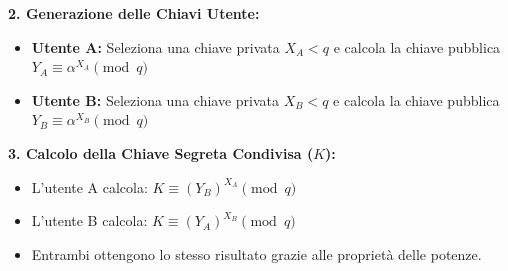 \documentclass{article}
\begin{document}
\vspace{0.3cm}
\noindent \textbf{2. Generazione delle Chiavi Utente:}
\begin{itemize}
    \item \textbf{Utente A:} Seleziona una chiave privata $X_A < q$ e calcola la chiave pubblica $Y_A \equiv \alpha^{X_A} \pmod q$
    \item \textbf{Utente B:} Seleziona una chiave privata $X_B < q$ e calcola la chiave pubblica $Y_B \equiv \alpha^{X_B} \pmod q$
\end{itemize}

\vspace{0.3cm}
\noindent \textbf{3. Calcolo della Chiave Segreta Condivisa ($K$):}
\begin{itemize}
    \item L'utente A calcola: $K \equiv (Y_B)^{X_A} \pmod q$
    \item L'utente B calcola: $K \equiv (Y_A)^{X_B} \pmod q$
    \item Entrambi ottengono lo stesso risultato grazie alle proprietà delle potenze.
\end{itemize}
\end{document}
